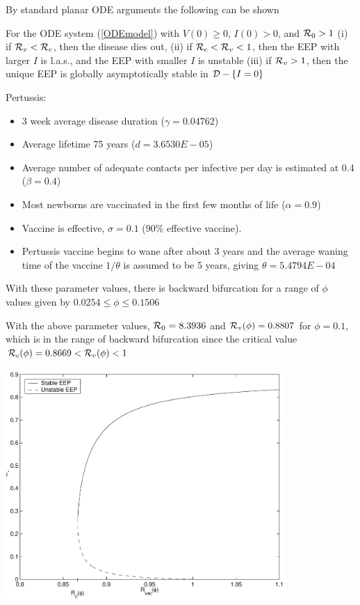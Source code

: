 \documentclass[aspectratio=169]{beamer}\usepackage[]{graphicx}\usepackage[]{xcolor}
\begin{document}
\begin{frame}
By standard planar ODE arguments the following can be shown
\vfill
\begin{theorem}
For the ODE system (\ref{ODEmodel}) with $V(0)\geq 0$, $I(0)>0$, and
$\mathcal{R}_0>1$
\vskip0.3cm
(i) if $\mathcal{R}_v<\mathcal{R}_c$, then the disease dies out,
\vskip0.3cm
(ii) if $\mathcal{R}_c<\mathcal{R}_v<1$, then the EEP
with larger $I$ is l.a.s., and the EEP with smaller $I$ is unstable
\vskip0.3cm
(iii) if $\mathcal{R}_v>1$, then the unique EEP is globally
asymptotically stable in $\mathcal{D}-\{I=0\}$
\label{th:odecase}
\end{theorem}
\end{frame}

\begin{frame}
Pertussis:
\begin{itemize}
\item 3 week average disease duration ($\gamma=0.04762$)
\item Average lifetime 75 years ($d=3.6530E-05$)
\item Average number of adequate contacts per infective per day is
 estimated at 0.4 ($\beta=0.4$)
\item Most newborns are vaccinated in the first few months of life
 ($\alpha=0.9$)
\item  Vaccine is effective, $\sigma=0.1$ (90\% effective vaccine).
\item Pertussis vaccine begins to wane after about 3 years
 and the average waning time of the vaccine
 $1/\theta$ is assumed to be 5 years, giving $\theta=5.4794E-04$
\end{itemize}
\vfill
With these parameter values, there is backward
bifurcation for a range of $\phi$ values given by $0.0254\leq\phi\leq0.1506$
\end{frame}

\begin{frame}
With the above parameter values, $\mathcal{R}_0=8.3936$ and
$\mathcal{R}_v(\phi)=0.8807$ for
$\phi=0.1$, which is in the range of backward bifurcation since the
critical value $\mathcal{R}_c(\phi)=0.8669<\mathcal{R}_v(\phi)<1$
\vfill
\begin{center}
   \includegraphics[width=0.8\textwidth]{FIGS/SIV_ode_bif_phi}
\end{center}
\end{frame}
\end{document}
